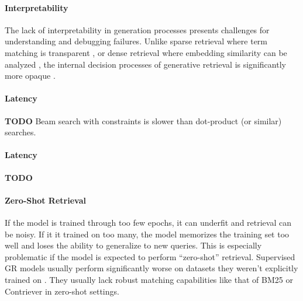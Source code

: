 \paragraph{Interpretability}
The lack of interpretability in generation processes presents challenges for understanding and debugging failures. Unlike sparse retrieval where term matching is transparent \cite{robertson-the-probabilistic,formal-splade-sparse}, or dense retrieval where embedding similarity can be analyzed \cite{vladimir-karpukhin-dense-passage}, the internal decision processes of generative retrieval is significantly more opaque \cite{tang-recent-advances,andrew-slavin-ross-evaluating-the}.


\paragraph{Latency}
\label{sec:latency}
\textbf{TODO}
Beam search with constraints is slower than dot-product (or similar) searches.


\paragraph{Latency}
\label{par:latency}
\textbf{TODO}


\paragraph{Zero-Shot Retrieval}
\label{sec:zero-shot}
If the model is trained through too few epochs, it can underfit and retrieval can be noisy. If it it trained on too many, the model memorizes the training set too well and loses the ability to generalize to new queries. This is especially problematic if the model is expected to perform ``zero-shot'' retrieval. Supervised GR models usually perform significantly worse on datasets they weren't explicitly trained on \cite{yuan-liu-on-the,zhen-zhang-replication-and}. They usually lack robust matching capabilities like that of BM25 or Contriever \cite{izacard-contriever} in zero-shot settings.




